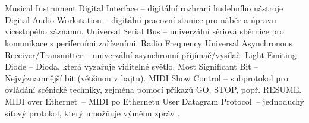 \cleardoublepage
\chapter*{\listofabbrevname}
{}

\begin{acronym}[KolikMista]
        {Musical Instrument Digital Interface -- digitální rozhraní hudebního nástroje}
        {Digital Audio Workstation -- digitální pracovní stanice pro náběr a úpravu vícestopého záznamu.}
        {Universal Serial Bus -- univerzální sériová sběrnice pro komunikace s periferními zařízeními.}
        {Radio Frequency}
        {Universal Asynchronous Receiver/Transmitter -- univerzální asynchronní přijímač/vysílač.}
        {Light-Emiting Diode -- Dioda, která vyzařuje viditelné světlo.}
        {Most Significant Bit -- Nejvýznamnější bit (většinou v bajtu).}
        {\acs{MIDI} Show Control -- subprotokol pro ovládání scénické techniky, zejména pomocí příkazů GO, STOP, popř. RESUME. \cite{MIDIspecs}}
        {\acs{MIDI} over Ethernet~-- \acs{MIDI} po Ethernetu}
        {User Datagram Protocol~-- jednoduchý síťový protokol, který umožňuje výměnu zpráv  \cite{UDPpaper}.}
%
%

\end{acronym}
